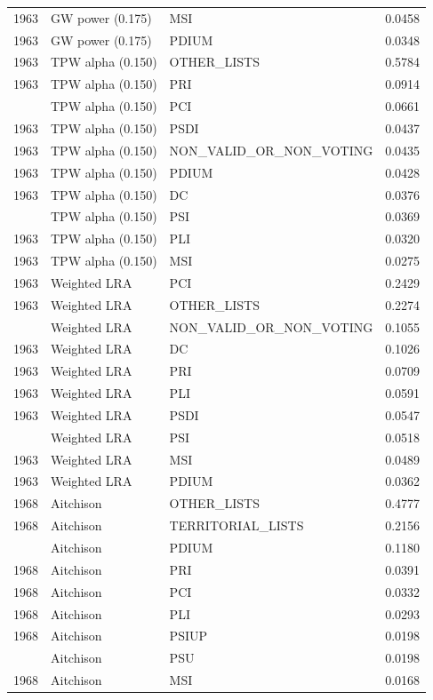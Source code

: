\begin{longtable}[t]{rllr}
1963 & GW power (0.175) & MSI & 0.0458\\
1963 & GW power (0.175) & PDIUM & 0.0348\\
1963 & TPW alpha (0.150) & OTHER\_LISTS & 0.5784\\
1963 & TPW alpha (0.150) & PRI & 0.0914\\
\addlinespace
1963 & TPW alpha (0.150) & PCI & 0.0661\\
1963 & TPW alpha (0.150) & PSDI & 0.0437\\
1963 & TPW alpha (0.150) & NON\_VALID\_OR\_NON\_VOTING & 0.0435\\
1963 & TPW alpha (0.150) & PDIUM & 0.0428\\
1963 & TPW alpha (0.150) & DC & 0.0376\\
\addlinespace
1963 & TPW alpha (0.150) & PSI & 0.0369\\
1963 & TPW alpha (0.150) & PLI & 0.0320\\
1963 & TPW alpha (0.150) & MSI & 0.0275\\
1963 & Weighted LRA & PCI & 0.2429\\
1963 & Weighted LRA & OTHER\_LISTS & 0.2274\\
\addlinespace
1963 & Weighted LRA & NON\_VALID\_OR\_NON\_VOTING & 0.1055\\
1963 & Weighted LRA & DC & 0.1026\\
1963 & Weighted LRA & PRI & 0.0709\\
1963 & Weighted LRA & PLI & 0.0591\\
1963 & Weighted LRA & PSDI & 0.0547\\
\addlinespace
1963 & Weighted LRA & PSI & 0.0518\\
1963 & Weighted LRA & MSI & 0.0489\\
1963 & Weighted LRA & PDIUM & 0.0362\\
1968 & Aitchison & OTHER\_LISTS & 0.4777\\
1968 & Aitchison & TERRITORIAL\_LISTS & 0.2156\\
\addlinespace
1968 & Aitchison & PDIUM & 0.1180\\
1968 & Aitchison & PRI & 0.0391\\
1968 & Aitchison & PCI & 0.0332\\
1968 & Aitchison & PLI & 0.0293\\
1968 & Aitchison & PSIUP & 0.0198\\
\addlinespace
1968 & Aitchison & PSU & 0.0198\\
1968 & Aitchison & MSI & 0.0168\\

\end{longtable}
